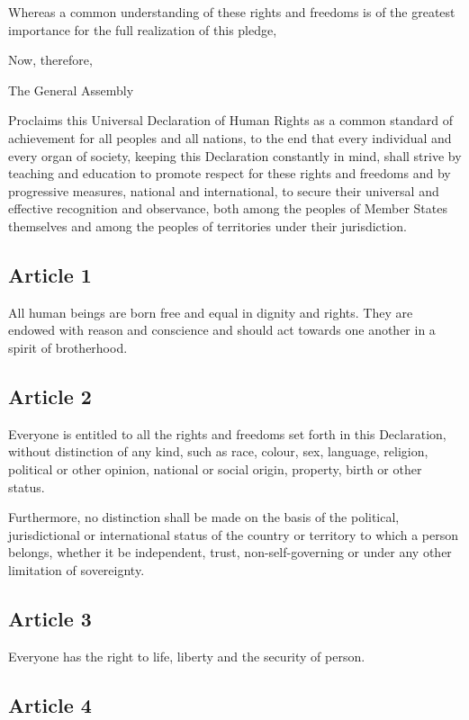 \documentclass[
  titlepage,
  openright,
  DIV=calc,
  toc=listof,
  listof=nochaptergap]{scrbook}
\begin{document}
Whereas a common understanding of these rights and freedoms is of the
greatest importance for the full realization of this pledge,

Now, therefore,

The General Assembly

Proclaims this Universal Declaration of Human Rights as a common
standard of achievement for all peoples and all nations, to the end that
every individual and every organ of society, keeping this Declaration
constantly in mind, shall strive by teaching and education to promote
respect for these rights and freedoms and by progressive measures,
national and international, to secure their universal and effective
recognition and observance, both among the peoples of Member States
themselves and among the peoples of territories under their
jurisdiction.

\subsection{Article 1}\label{article-1}

All human beings are born free and equal in dignity and rights. They are
endowed with reason and conscience and should act towards one another in
a spirit of brotherhood.

\subsection{Article 2}\label{article-2}

Everyone is entitled to all the rights and freedoms set forth in this
Declaration, without distinction of any kind, such as race, colour, sex,
language, religion, political or other opinion, national or social
origin, property, birth or other status.

Furthermore, no distinction shall be made on the basis of the political,
jurisdictional or international status of the country or territory to
which a person belongs, whether it be independent, trust,
non-self-governing or under any other limitation of sovereignty.

\subsection{Article 3}\label{article-3}

Everyone has the right to life, liberty and the security of person.

\subsection{Article 4}\label{article-4}
\end{document}
